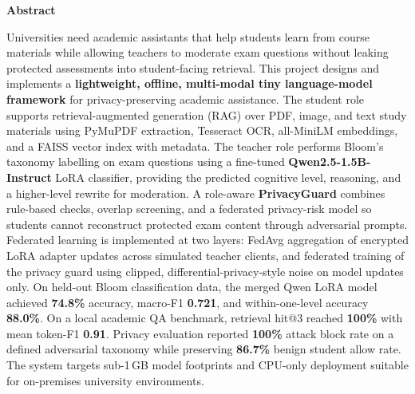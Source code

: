 \newpage
\begin{center}
    \vspace*{0.05cm}
    \Large
    \textbf{Abstract}\\
    \vspace{0.5cm}
\end{center}

Universities need academic assistants that help students learn from course materials while allowing teachers to moderate exam questions without leaking protected assessments into student-facing retrieval. This project designs and implements a \textbf{lightweight, offline, multi-modal tiny language-model framework} for privacy-preserving academic assistance. The student role supports retrieval-augmented generation (RAG) over PDF, image, and text study materials using PyMuPDF extraction, Tesseract OCR, all-MiniLM embeddings, and a FAISS vector index with metadata. The teacher role performs Bloom's taxonomy labelling on exam questions using a fine-tuned \textbf{Qwen2.5-1.5B-Instruct} LoRA classifier, providing the predicted cognitive level, reasoning, and a higher-level rewrite for moderation. A role-aware \textbf{PrivacyGuard} combines rule-based checks, overlap screening, and a federated privacy-risk model so students cannot reconstruct protected exam content through adversarial prompts. Federated learning is implemented at two layers: FedAvg aggregation of encrypted LoRA adapter updates across simulated teacher clients, and federated training of the privacy guard using clipped, differential-privacy-style noise on model updates only. On held-out Bloom classification data, the merged Qwen LoRA model achieved \textbf{74.8\%} accuracy, macro-F1 \textbf{0.721}, and within-one-level accuracy \textbf{88.0\%}. On a local academic QA benchmark, retrieval hit@3 reached \textbf{100\%} with mean token-F1 \textbf{0.91}. Privacy evaluation reported \textbf{100\%} attack block rate on a defined adversarial taxonomy while preserving \textbf{86.7\%} benign student allow rate. The system targets sub-1\,GB model footprints and CPU-only deployment suitable for on-premises university environments.
